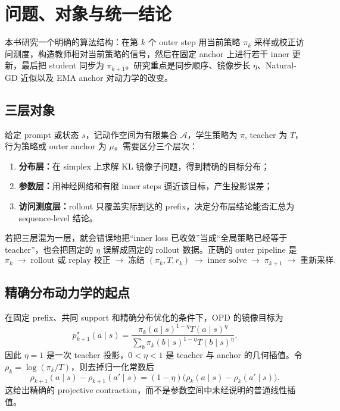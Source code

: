\chapter{问题、对象与统一结论}

本书研究一个明确的算法结构：在第 $k$ 个 outer step 用当前策略 $\pi_k$ 采样或校正访问测度，构造教师相对当前策略的信号，然后在固定 anchor 上进行若干 inner 更新，最后把 student 同步为 $\pi_{k+1}$。研究重点是同步顺序、镜像步长 $\eta$、Natural-GD 近似以及 EMA anchor 对动力学的改变。

\section{三层对象}

给定 prompt 或状态 $s$，记动作空间为有限集合 $\mathcal A$，学生策略为 $\pi$, teacher 为 $T$，行为策略或 outer anchor 为 $\mu$。需要区分三个层次：

\begin{enumerate}
    \item \textbf{分布层：}在 simplex 上求解 KL 镜像子问题，得到精确的目标分布；
    \item \textbf{参数层：}用神经网络和有限 inner steps 逼近该目标，产生投影误差；
    \item \textbf{访问测度层：}rollout 只覆盖实际到达的 prefix，决定分布层结论能否汇总为 sequence-level 结论。
\end{enumerate}

若把三层混为一层，就会错误地把“inner loss 已收敛”当成“全局策略已经等于 teacher”，也会把固定的 $\eta$ 误解成固定的 rollout 数据。正确的 outer pipeline 是
\[
\pi_k\;\longrightarrow\;\text{rollout 或 replay 校正}\;\longrightarrow\;
\text{冻结 }(\pi_k,T,r_k)\;\longrightarrow\;\text{inner solve}\;\longrightarrow\;
\pi_{k+1}\;\longrightarrow\;\text{重新采样}.
\]

\section{精确分布动力学的起点}

在固定 prefix、共同 support 和精确分布优化的条件下，OPD 的镜像目标为
\[
 p_{k+1}^{\star}(a\mid s)=
 \frac{\pi_k(a\mid s)^{1-\eta}T(a\mid s)^\eta}
 {\sum_b\pi_k(b\mid s)^{1-\eta}T(b\mid s)^\eta}.
\]
因此 $\eta=1$ 是一次 teacher 投影，$0<\eta<1$ 是 teacher 与 anchor 的几何插值。令 $\rho_k=\log(\pi_k/T)$，则去掉归一化常数后
\[
\rho_{k+1}(a\mid s)-\rho_{k+1}(a'\mid s)
=(1-\eta)\bigl(\rho_k(a\mid s)-\rho_k(a'\mid s)\bigr).
\]
这给出精确的 projective contraction，而不是参数空间中未经说明的普通线性插值。

